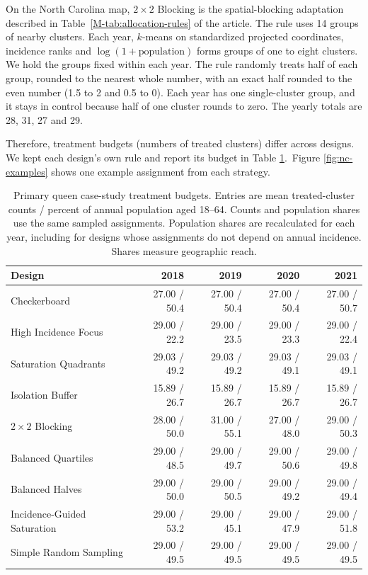 \documentclass[11pt]{article}
\begin{document}
On the North Carolina map, $2\times2$ Blocking is the spatial-blocking
adaptation described in Table~\ref{M-tab:allocation-rules} of the article.
The rule uses 14 groups of nearby clusters. Each year, \(k\)-means
on standardized projected coordinates, incidence ranks and
$\log(1+\text{population})$ forms groups of one to eight clusters. We
hold the groups fixed within each year. The rule randomly treats half
of each group, rounded to the nearest whole number, with an exact half
rounded to the even number (1.5 to 2 and 0.5 to 0). Each year has one
single-cluster group, and it stays in control because half of one
cluster rounds to zero. The yearly totals are 28, 31, 27 and 29.

Therefore, treatment budgets (numbers of treated clusters) differ across designs. We kept each design's own rule and report its budget in Table \ref{tab:nc-budgets}.\iffullsi\ Figure \ref{fig:nc-examples} shows one
example assignment from each strategy.\fi

\begin{table}[!htb]
\small
\centering

\caption{Primary queen case-study treatment budgets. Entries are mean treated-cluster counts / percent of annual population aged 18--64. Counts and population shares use the same sampled assignments. Population shares are recalculated for each year, including for designs whose assignments do not depend on annual incidence. Shares measure geographic reach.}
\label{tab:nc-budgets}

\begin{tabular}{p{4.1cm}rrrr}
\toprule
Design & 2018 & 2019 & 2020 & 2021 \\
\midrule
Checkerboard & 27.00 / 50.4 & 27.00 / 50.4 & 27.00 / 50.4 & 27.00 / 50.7 \\
High Incidence Focus & 29.00 / 22.2 & 29.00 / 23.5 & 29.00 / 23.3 & 29.00 / 22.4 \\
Saturation Quadrants & 29.03 / 49.2 & 29.03 / 49.2 & 29.03 / 49.1 & 29.03 / 49.1 \\
Isolation Buffer & 15.89 / 26.7 & 15.89 / 26.7 & 15.89 / 26.7 & 15.89 / 26.7 \\
$2\times2$ Blocking & 28.00 / 50.0 & 31.00 / 55.1 & 27.00 / 48.0 & 29.00 / 50.3 \\
Balanced Quartiles & 29.00 / 48.5 & 29.00 / 49.7 & 29.00 / 50.6 & 29.00 / 49.8 \\
Balanced Halves & 29.00 / 50.0 & 29.00 / 50.5 & 29.00 / 49.2 & 29.00 / 49.4 \\
Incidence-Guided Saturation & 29.00 / 53.2 & 29.00 / 45.1 & 29.00 / 47.9 & 29.00 / 51.8 \\
Simple Random Sampling & 29.00 / 49.5 & 29.00 / 49.5 & 29.00 / 49.5 & 29.00 / 49.5 \\

\bottomrule
\end{tabular}
\end{table}
\end{document}
